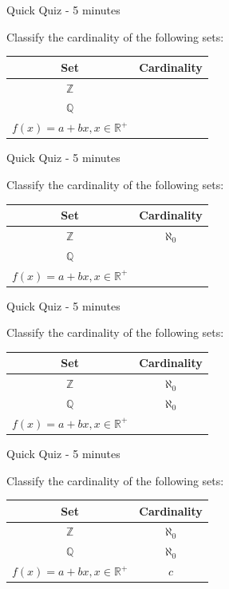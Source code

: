 \documentclass[aspectratio=169]{beamer}
\begin{document}
\begin{frame}{Quick Quiz - 5 minutes}

Classify the cardinality of the following sets:
\begin{center}
\begin{tabular}{c|c}
    Set & Cardinality \\
    \hline
    $\mathbb{Z}$ &  \\
    $\mathbb{Q}$ &  \\
    $f(x) = a + bx, x\in\mathbb{R^+}$ &
\end{tabular}
\end{center}

\end{frame}

\begin{frame}{Quick Quiz - 5 minutes}

Classify the cardinality of the following sets:
\begin{center}
\begin{tabular}{c|c}
    Set & Cardinality \\
    \hline
    $\mathbb{Z}$ & $\aleph_0$  \\
    $\mathbb{Q}$ & \\
    $f(x) = a + bx, x\in\mathbb{R^+}$ &
\end{tabular}
\end{center}

\end{frame}

\begin{frame}{Quick Quiz - 5 minutes}

Classify the cardinality of the following sets:
\begin{center}
\begin{tabular}{c|c}
    Set & Cardinality \\
    \hline
    $\mathbb{Z}$ & $\aleph_0$  \\
    $\mathbb{Q}$ &  $\aleph_0$ \\
    $f(x) = a + bx, x\in\mathbb{R^+}$ &
\end{tabular}
\end{center}

\end{frame}

\begin{frame}{Quick Quiz - 5 minutes}

Classify the cardinality of the following sets:
\begin{center}
\begin{tabular}{c|c}
    Set & Cardinality \\
    \hline
    $\mathbb{Z}$ & $\aleph_0$  \\
    $\mathbb{Q}$ &  $\aleph_0$ \\
    $f(x) = a + bx, x\in\mathbb{R^+}$ & $c$
\end{tabular}
\end{center}
\end{frame}
\end{document}
